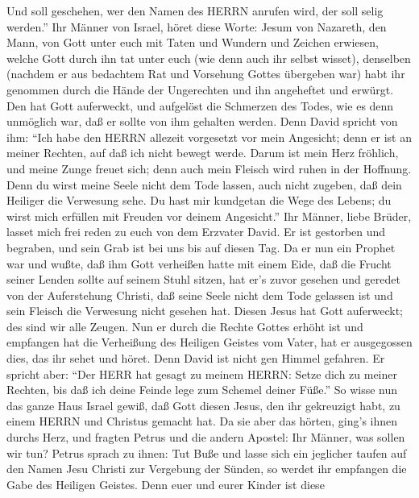  Und soll geschehen, wer den Namen des HERRN anrufen wird,
der soll selig werden.''  Ihr Männer von Israel, höret
diese Worte: Jesum von Nazareth, den Mann, von Gott unter euch mit Taten
und Wundern und Zeichen erwiesen, welche Gott durch ihn tat unter euch
(wie denn auch ihr selbst wisset),  denselben (nachdem er
aus bedachtem Rat und Vorsehung Gottes übergeben war) habt ihr genommen
durch die Hände der Ungerechten und ihn angeheftet und erwürgt.
 Den hat Gott auferweckt, und aufgelöst die Schmerzen des
Todes, wie es denn unmöglich war, daß er sollte von ihm gehalten werden.
 Denn David spricht von ihm: ``Ich habe den HERRN allezeit
vorgesetzt vor mein Angesicht; denn er ist an meiner Rechten, auf daß
ich nicht bewegt werde.  Darum ist mein Herz fröhlich, und
meine Zunge freuet sich; denn auch mein Fleisch wird ruhen in der
Hoffnung.  Denn du wirst meine Seele nicht dem Tode lassen,
auch nicht zugeben, daß dein Heiliger die Verwesung sehe. 
Du hast mir kundgetan die Wege des Lebens; du wirst mich erfüllen mit
Freuden vor deinem Angesicht.''  Ihr Männer, liebe Brüder,
lasset mich frei reden zu euch von dem Erzvater David. Er ist gestorben
und begraben, und sein Grab ist bei uns bis auf diesen Tag.
 Da er nun ein Prophet war und wußte, daß ihm Gott
verheißen hatte mit einem Eide, daß die Frucht seiner Lenden sollte auf
seinem Stuhl sitzen,  hat er's zuvor gesehen und geredet
von der Auferstehung Christi, daß seine Seele nicht dem Tode gelassen
ist und sein Fleisch die Verwesung nicht gesehen hat. 
Diesen Jesus hat Gott auferweckt; des sind wir alle Zeugen.
 Nun er durch die Rechte Gottes erhöht ist und empfangen
hat die Verheißung des Heiligen Geistes vom Vater, hat er ausgegossen
dies, das ihr sehet und höret.  Denn David ist nicht gen
Himmel gefahren. Er spricht aber: ``Der HERR hat gesagt zu meinem HERRN:
Setze dich zu meiner Rechten,  bis daß ich deine Feinde
lege zum Schemel deiner Füße.''  So wisse nun das ganze
Haus Israel gewiß, daß Gott diesen Jesus, den ihr gekreuzigt habt, zu
einem HERRN und Christus gemacht hat.  Da sie aber das
hörten, ging's ihnen durchs Herz, und fragten Petrus und die andern
Apostel: Ihr Männer, was sollen wir tun?  Petrus sprach zu
ihnen: Tut Buße und lasse sich ein jeglicher taufen auf den Namen Jesu
Christi zur Vergebung der Sünden, so werdet ihr empfangen die Gabe des
Heiligen Geistes.  Denn euer und eurer Kinder ist diese
